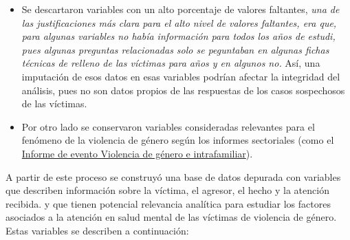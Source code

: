 \documentclass[
]{article}
\begin{document}
\begin{itemize}
\item
  Se descartaron variables con un alto porcentaje de valores faltantes,
  \emph{una de las justificaciones más clara para el alto nivel de
  valores faltantes, era que, para algunas variables no había
  información para todos los años de estudi, pues algunas preguntas
  relacionadas solo se peguntaban en algunas fichas técnicas de relleno
  de las víctimas para años y en algunos no.} Así, una imputación de
  esos datos en esas variables podrían afectar la integridad del
  análisis, pues no son datos propios de las respuestas de los casos
  sospechosos de las víctimas.
\item
  Por otro lado se conservaron variables consideradas relevantes para el
  fenómeno de la violencia de género según los informes sectoriales
  (como el
  \href{https://www.ins.gov.co/buscador-eventos/Informesdeevento/VIOLENCIA\%20DE\%20GENERO\%20INFORME\%20DE\%20EVENTO\%202023.pdf}{Informe
  de evento Violencia de género e intrafamiliar}).
\end{itemize}

A partir de este proceso se construyó una base de datos depurada con
variables que describen información sobre la víctima, el agresor, el
hecho y la atención recibida. y que tienen potencial relevancia
analítica para estudiar los factores asociados a la atención en salud
mental de las víctimas de violencia de género. Estas variables se
describen a continuación:
\end{document}
